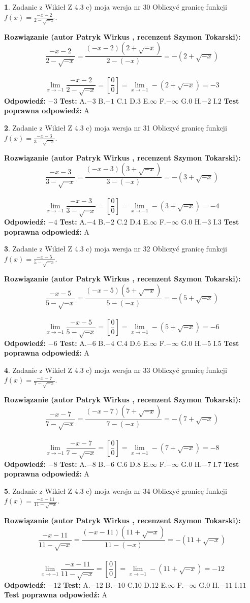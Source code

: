 \documentclass[12pt, a4paper]{article}
\theoremstyle{definition} %
\newtheorem{zad}{}
\newcommand{\zadStart}[1]{\begin{zad}#1\newline}
\newcommand{\zadStop}{\end{zad}}
\newcommand{\rozwStart}[2]{\noindent \textbf{Rozwiązanie (autor #1 , recenzent #2): }\newline}
\newcommand{\rozwStop}{\newline}
\newcommand{\odpStart}{\noindent \textbf{Odpowiedź:}\newline}
\newcommand{\odpStop}{\newline}
\newcommand{\testStart}{\noindent \textbf{Test:}\newline}
\newcommand{\testStop}{\newline}
\newcommand{\kluczStart}{\noindent \textbf{Test poprawna odpowiedź:}\newline}
\newcommand{\kluczStop}{\newline}
\begin{document}
\zadStart{Zadanie z Wikieł Z 4.3 c) moja wersja nr 30}
Obliczyć granicę funkcji $f(x)=\frac{-x-2}{2-\sqrt{-x}}$.
\zadStop
\rozwStart{Patryk Wirkus}{Szymon Tokarski}
$$\frac{-x-2}{2-\sqrt{-x}}=\frac{(-x-2)(2+\sqrt{-x})}{2-(-x)}=-(2+\sqrt{-x})$$
\\
$$\lim\limits_{x\to-1}\frac{-x-2}{2-\sqrt{-x}}=[\frac{0}{0}]=\lim\limits_{x\to-1}-(2+\sqrt{-x}) =-3$$
\rozwStop
\odpStart
$-3$
\odpStop
\testStart
A.$-3$
B.$-1$
C.$1$
D.$3$
E.$\infty$
F.$-\infty$
G.$0$
H.$-2$
I.$2$
\testStop
\kluczStart
A
\kluczStop



\zadStart{Zadanie z Wikieł Z 4.3 c) moja wersja nr 31}
Obliczyć granicę funkcji $f(x)=\frac{-x-3}{3-\sqrt{-x}}$.
\zadStop
\rozwStart{Patryk Wirkus}{Szymon Tokarski}
$$\frac{-x-3}{3-\sqrt{-x}}=\frac{(-x-3)(3+\sqrt{-x})}{3-(-x)}=-(3+\sqrt{-x})$$
\\
$$\lim\limits_{x\to-1}\frac{-x-3}{3-\sqrt{-x}}=[\frac{0}{0}]=\lim\limits_{x\to-1}-(3+\sqrt{-x}) =-4$$
\rozwStop
\odpStart
$-4$
\odpStop
\testStart
A.$-4$
B.$-2$
C.$2$
D.$4$
E.$\infty$
F.$-\infty$
G.$0$
H.$-3$
I.$3$
\testStop
\kluczStart
A
\kluczStop



\zadStart{Zadanie z Wikieł Z 4.3 c) moja wersja nr 32}
Obliczyć granicę funkcji $f(x)=\frac{-x-5}{5-\sqrt{-x}}$.
\zadStop
\rozwStart{Patryk Wirkus}{Szymon Tokarski}
$$\frac{-x-5}{5-\sqrt{-x}}=\frac{(-x-5)(5+\sqrt{-x})}{5-(-x)}=-(5+\sqrt{-x})$$
\\
$$\lim\limits_{x\to-1}\frac{-x-5}{5-\sqrt{-x}}=[\frac{0}{0}]=\lim\limits_{x\to-1}-(5+\sqrt{-x}) =-6$$
\rozwStop
\odpStart
$-6$
\odpStop
\testStart
A.$-6$
B.$-4$
C.$4$
D.$6$
E.$\infty$
F.$-\infty$
G.$0$
H.$-5$
I.$5$
\testStop
\kluczStart
A
\kluczStop



\zadStart{Zadanie z Wikieł Z 4.3 c) moja wersja nr 33}
Obliczyć granicę funkcji $f(x)=\frac{-x-7}{7-\sqrt{-x}}$.
\zadStop
\rozwStart{Patryk Wirkus}{Szymon Tokarski}
$$\frac{-x-7}{7-\sqrt{-x}}=\frac{(-x-7)(7+\sqrt{-x})}{7-(-x)}=-(7+\sqrt{-x})$$
\\
$$\lim\limits_{x\to-1}\frac{-x-7}{7-\sqrt{-x}}=[\frac{0}{0}]=\lim\limits_{x\to-1}-(7+\sqrt{-x}) =-8$$
\rozwStop
\odpStart
$-8$
\odpStop
\testStart
A.$-8$
B.$-6$
C.$6$
D.$8$
E.$\infty$
F.$-\infty$
G.$0$
H.$-7$
I.$7$
\testStop
\kluczStart
A
\kluczStop



\zadStart{Zadanie z Wikieł Z 4.3 c) moja wersja nr 34}
Obliczyć granicę funkcji $f(x)=\frac{-x-11}{11-\sqrt{-x}}$.
\zadStop
\rozwStart{Patryk Wirkus}{Szymon Tokarski}
$$\frac{-x-11}{11-\sqrt{-x}}=\frac{(-x-11)(11+\sqrt{-x})}{11-(-x)}=-(11+\sqrt{-x})$$
\\
$$\lim\limits_{x\to-1}\frac{-x-11}{11-\sqrt{-x}}=[\frac{0}{0}]=\lim\limits_{x\to-1}-(11+\sqrt{-x}) =-12$$
\rozwStop
\odpStart
$-12$
\odpStop
\testStart
A.$-12$
B.$-10$
C.$10$
D.$12$
E.$\infty$
F.$-\infty$
G.$0$
H.$-11$
I.$11$
\testStop
\kluczStart
A
\kluczStop
\end{document}
